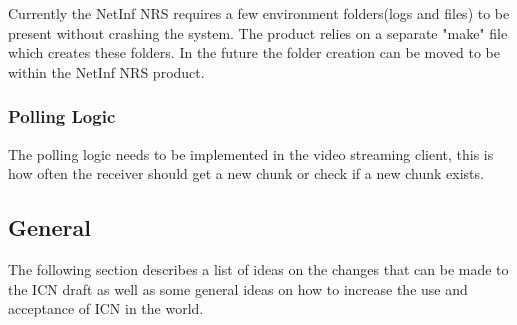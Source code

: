 Currently the NetInf NRS requires a few environment folders(logs and files) to be present without crashing the system. The product relies on a separate "make" file which creates these folders. In the future the folder creation can be moved to be within the NetInf NRS product.

\subsubsection{Polling Logic}

The polling logic needs to be implemented in the video streaming client, this is how often the receiver should get a new chunk or check if a new chunk exists.  

\subsection{General}

The following section describes a list of ideas on the changes that can be made to the ICN draft as well as some general ideas on how to increase the use and acceptance of ICN in the world. 


